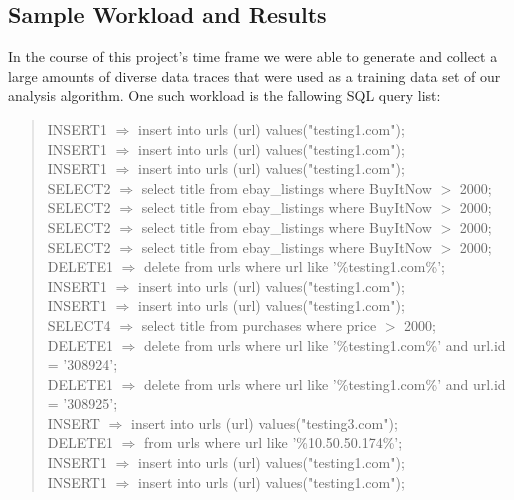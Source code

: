 \documentclass[11pt, oneside]{article}
\begin{document}
\subsection{Sample Workload and Results}
In the course of this project's time frame we were able to generate and collect
a large amounts of diverse data traces that were used as a training data set of
our analysis algorithm. One such workload is the fallowing SQL query list:

\begin{quote}
INSERT1 $\Longrightarrow$ insert into urls (url) values("testing1.com");\\
INSERT1 $\Longrightarrow$ insert into urls (url) values("testing1.com");\\
INSERT1 $\Longrightarrow$ insert into urls (url) values("testing1.com");\\
SELECT2 $\Longrightarrow$ select title from ebay\_listings where BuyItNow $>$ 2000;\\
SELECT2 $\Longrightarrow$ select title from ebay\_listings where BuyItNow $>$ 2000;\\
SELECT2 $\Longrightarrow$ select title from ebay\_listings where BuyItNow $>$ 2000;\\
SELECT2 $\Longrightarrow$ select title from ebay\_listings where BuyItNow $>$ 2000;\\
DELETE1 $\Longrightarrow$ delete from urls where url like '\%testing1.com\%'; \\
INSERT1 $\Longrightarrow$ insert into urls (url) values("testing1.com");\\
INSERT1 $\Longrightarrow$ insert into urls (url) values("testing1.com");\\
SELECT4 $\Longrightarrow$ select title from purchases where price $>$ 2000;\\
DELETE1 $\Longrightarrow$ delete from urls where url like '\%testing1.com\%' and url.id = '308924';\\
DELETE1 $\Longrightarrow$ delete from urls where url like '\%testing1.com\%' and url.id = '308925';\\
INSERT $\Longrightarrow$ insert into urls (url) values("testing3.com");\\
DELETE1 $\Longrightarrow$ from urls where url like '\%10.50.50.174\%';\\
INSERT1 $\Longrightarrow$ insert into urls (url) values("testing1.com");\\
INSERT1 $\Longrightarrow$ insert into urls (url) values("testing1.com");\\
\end{quote}
\end{document}
